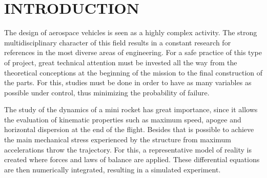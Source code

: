 \documentclass[10pt,fleqn,a4paper,twoside]{article}
\begin{document}
\section{INTRODUCTION}


The design of aerospace vehicles is seen as a highly complex activity. The strong multidisciplinary character of this field results in a constant research for references in the most diverse areas of engineering. For a safe practice of this type of project, great technical attention must be invested all the way from the theoretical conceptions at the beginning of the mission to the final construction of the parts. For this, studies must be done in order to have as many variables as possible under control, thus minimizing the probability of failure.


The study of the dynamics of a mini rocket has great importance, since it allows the evaluation of kinematic properties such as maximum speed, apogee and horizontal dispersion at the end of the flight. Besides that is possible to achieve the main mechanical stress experienced by the structure from maximum accelerations throw the trajectory. For this, a representative model of reality is created where forces and laws of balance are applied. These differential equations are then numerically integrated, resulting in a simulated experiment.


\end{document}
